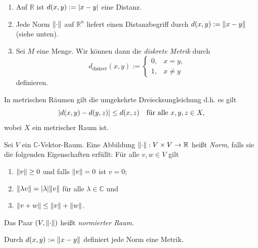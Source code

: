 \documentclass[
12pt, 
openany, 
a4paper, 
final,
fleqn, 
]{myclass}
\numberwithin{equation}{chapter}
\numberwithin{section}{chapter}
\newcommand{\RR}{\mathbb R}
\newcommand{\CC}{\mathbb C}
\DeclarePairedDelimiter{\abs}{\lvert}{\rvert}
\DeclarePairedDelimiter{\norm}{\lVert}{\rVert}
\begin{document}
\begin{eg}\label{1.2}
\begin{enumerate}[label=(\arabic*)]
\item Auf $\RR$ ist $d(x, y) := \abs{x-y}$ eine Distanz. 

\item Jede Norm $\norm{\cdot}$ auf $\RR^n$ liefert einen Distanzbegriff durch $d(x, y) := \norm{x-y}$ (siehe unten).

\item Sei $M$ eine Menge. Wir können dann die \emph{diskrete Metrik} durch 
\[
d_{\operatorname{diskret}}(x, y) := 
\begin{cases}
0,& x=y, \\
1, & x\neq y
\end{cases}
\]
definieren.
\end{enumerate}
\end{eg}
\begin{rmk}
In metrischen Räumen gilt die umgekehrte Dreiecksungleichung d.h. es gilt
\[
\abs{d(x, y) - d(y, z)} \leq d(x, z) \quad \text{für alle }x, y, z\in X, 
\]
wobei $X$ ein metrischer Raum ist. 
\end{rmk}
\begin{defn}\label{1.4}
Sei $V$ ein $\CC$-Vektor-Raum. Eine Abbildung $\norm{\cdot}: V\times V \to \RR$ heißt \emph{Norm}, falls sie die folgenden Eigenschaften erfüllt: Für alle $v, w \in V$ gilt
\begin{enumerate}[label=(N\arabic*)]
\item $\norm{v} \geq 0$ und falls $\norm v = 0 $ ist $v=0$; 

\item $\norm{\lambda v} = \abs \lambda \norm v$ für alle $\lambda \in \CC$ und 

\item $\norm{v+w} \leq \norm v + \norm w$. 
\end{enumerate}
Das Paar $(V, \norm{\cdot})$ heißt \emph{normierter Raum}. 
\end{defn}
\begin{rmk}
Durch $d(x, y):= \norm{x-y}$ definiert jede Norm eine Metrik. 
\end{rmk}
\end{document}
